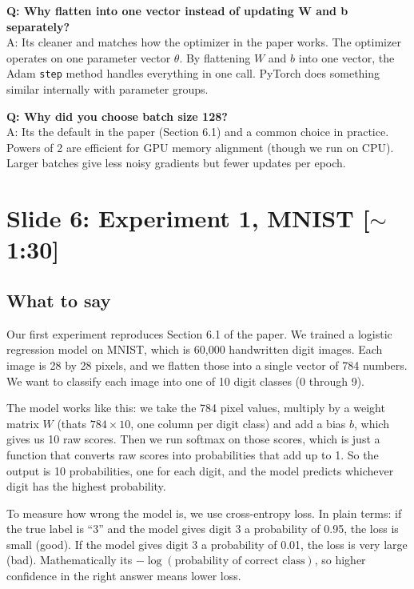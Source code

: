 \documentclass[11pt, letterpaper]{article}
\begin{document}
\begin{qabox}
\textbf{Q: Why flatten into one vector instead of updating W and b separately?}\\
A: Its cleaner and matches how the optimizer in the paper works. The optimizer operates on one parameter vector $\theta$. By flattening $W$ and $b$ into one vector, the Adam \texttt{step} method handles everything in one call. PyTorch does something similar internally with parameter groups.

\textbf{Q: Why did you choose batch size 128?}\\
A: Its the default in the paper (Section 6.1) and a common choice in practice. Powers of 2 are efficient for GPU memory alignment (though we run on CPU). Larger batches give less noisy gradients but fewer updates per epoch.
\end{qabox}


\section{Slide 6: Experiment 1, MNIST \textnormal{\color{muted}[$\sim$1:30]}}

\subsection{What to say}

Our first experiment reproduces Section 6.1 of the paper. We trained a logistic regression model on MNIST, which is 60,000 handwritten digit images. Each image is 28 by 28 pixels, and we flatten those into a single vector of 784 numbers. We want to classify each image into one of 10 digit classes (0 through 9).

The model works like this: we take the 784 pixel values, multiply by a weight matrix $W$ (thats $784 \times 10$, one column per digit class) and add a bias $b$, which gives us 10 raw scores. Then we run softmax on those scores, which is just a function that converts raw scores into probabilities that add up to 1. So the output is 10 probabilities, one for each digit, and the model predicts whichever digit has the highest probability.

To measure how wrong the model is, we use cross-entropy loss. In plain terms: if the true label is ``3'' and the model gives digit 3 a probability of 0.95, the loss is small (good). If the model gives digit 3 a probability of 0.01, the loss is very large (bad). Mathematically its $-\log(\text{probability of correct class})$, so higher confidence in the right answer means lower loss.
\end{document}
